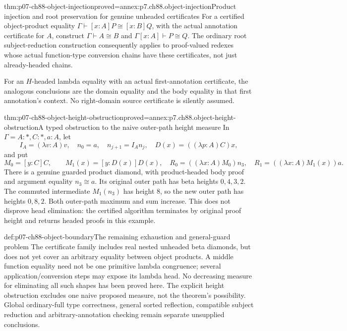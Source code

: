 \begin{hbtheorem}{thm:p07-ch88-object-injection}{proved=annex:p7.ch88.object-injection}{Product injection and root preservation for genuine unheaded certificates}
For a certified object-product equality
\(\Gamma\vdash[x:A]P\cong[x:B]Q\), with the actual annotation
certificate for \(A\), construct
\(\Gamma\vdash A\cong B\) and
\(\Gamma[x:A]\vdash P\cong Q\).
The ordinary root subject-reduction construction consequently applies to
proof-valued redexes whose actual function-type conversion chains have
these certificates, not just already-headed chains.

For an \(H\)-headed lambda equality with an actual first-annotation
certificate, the analogous conclusions are the domain equality and the
body equality in that first annotation's context. No right-domain source
certificate is silently assumed.
\end{hbtheorem}

\begin{hbtheorem}{thm:p07-ch88-object-height-obstruction}{proved=annex:p7.ch88.object-height-obstruction}{A typed obstruction to the naive outer-path height measure}
In \(\Gamma=A:\ast,C:\ast,a:A\), let
\[
 I_A=(\lambda v:A)v,\quad n_0=a,\quad n_{j+1}=I_A n_j,
 \quad D(x)=((\lambda p:A)C)x,
\]
and put
\[
 M_0=[y:C]C,\qquad M_1(x)=[y:D(x)]D(x),
 \quad R_0=((\lambda x:A)M_0)n_3,
 \quad R_1=((\lambda x:A)M_1(x))a.
\]
There is a genuine guarded product diamond, with product-headed body
proof and argument equality \(n_3\cong a\). Its original outer path
has beta heights \(0,4,3,2\). The commuted intermediate \(M_1(n_3)\)
has height \(8\), so the new outer path has heights \(0,8,2\).
Both outer-path maximum and sum increase. This does not disprove head
elimination: the certified algorithm terminates by original proof height
and returns headed proofs in this example.
\end{hbtheorem}

\begin{proofboundary}{def:p07-ch88-object-boundary}{The remaining exhaustion and general-guard problem}
The certificate family includes real nested unheaded beta diamonds, but
does not yet cover an arbitrary equality between object products. A
middle function equality need not be one primitive lambda congruence;
several application/conversion steps may expose its lambda head. No
decreasing measure for eliminating all such shapes has been proved here.
The explicit height obstruction excludes one naive proposed measure, not
the theorem's possibility. Global ordinary-full type correctness, general
sorted reflection, compatible subject reduction and arbitrary-annotation
checking remain separate unsupplied conclusions.
\end{proofboundary}

